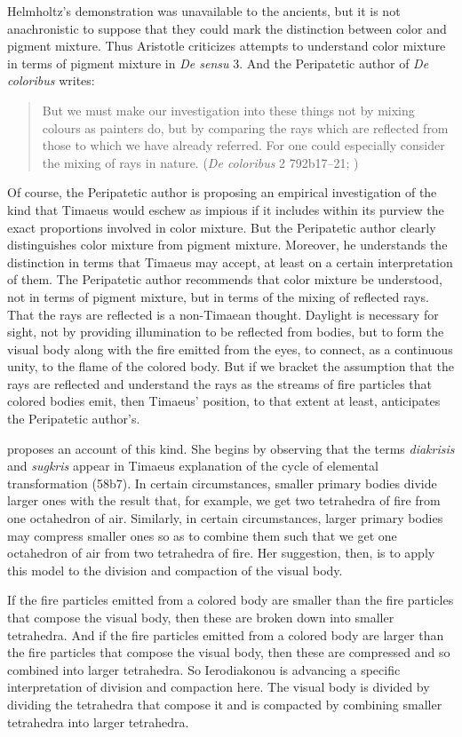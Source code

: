 Helmholtz's demonstration was unavailable to the ancients, but it is not anachronistic to suppose that they could mark the distinction between color and pigment mixture. Thus Aristotle criticizes attempts to understand color mixture in terms of pigment mixture in \emph{De sensu} 3. And the Peripatetic author of \emph{De coloribus} writes: 
\begin{quote}
	But we must make our investigation into these things not by mixing colours as painters do, but by comparing the rays which are reflected from those to which we have already referred. For one could especially consider the mixing of rays in nature. (\emph{De coloribus} 2 792b17--21; \citealt[13]{Hett:1936sd})
\end{quote}
Of course, the Peripatetic author is proposing an empirical investigation of the kind that Timaeus would eschew as impious if it includes within its purview the exact proportions involved in color mixture. But the Peripatetic author clearly distinguishes color mixture from pigment mixture. Moreover, he understands the distinction in terms that Timaeus may accept, at least on a certain interpretation of them. The Peripatetic author recommends that color mixture be understood, not in terms of pigment mixture, but in terms of the mixing of reflected rays. That the rays are reflected is a non-Timaean thought. Daylight is necessary for sight, not by providing illumination to be reflected from bodies, but to form the visual body along with the fire emitted from the eyes, to connect, as a continuous unity, to the flame of the colored body. But if we bracket the assumption that the rays are reflected and understand the rays as the streams of fire particles that colored bodies emit, then Timaeus' position, to that extent at least, anticipates the Peripatetic author's.

\citet{Ierodiakonou:2005ly} proposes an account of this kind. She begins by observing that the terms \emph{diakrisis} and \emph{sugkris} appear in Timaeus explanation of the cycle of elemental transformation (58b7). In certain circumstances, smaller primary bodies divide larger ones with the result that, for example, we get two tetrahedra of fire from one octahedron of air. Similarly, in certain circumstances, larger primary bodies may compress smaller ones so as to combine them such that we get one octahedron of air from two tetrahedra of fire. Her suggestion, then, is to apply this model to the division and compaction of the visual body.

If the fire particles emitted from a colored body are smaller than the fire particles that compose the visual body, then these are broken down into smaller tetrahedra. And if the fire particles emitted from a colored body are larger than the fire particles that compose the visual body, then these are compressed and so combined into larger tetrahedra. So Ierodiakonou is advancing a specific interpretation of division and compaction here. The visual body is divided by dividing the tetrahedra that compose it and is compacted by combining smaller tetrahedra into larger tetrahedra.

